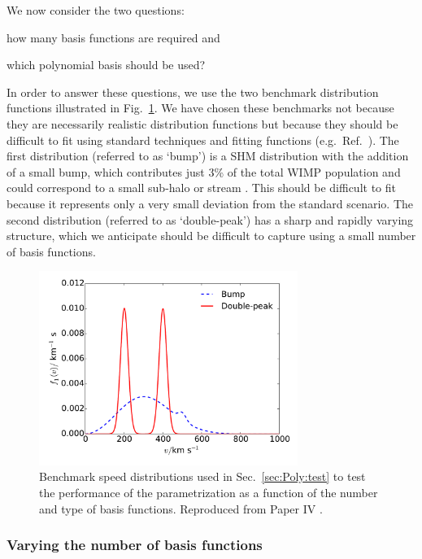 We now consider the two questions: \begin{inparaenum}[(i)] \item how many basis functions are required and \item which polynomial basis should be used? \end{inparaenum} In order to answer these questions, we use the two benchmark distribution functions illustrated in Fig.~\ref{fig:Poly:VaryingN_distributions}. We have chosen these benchmarks not because they are necessarily realistic distribution functions but because they should be difficult to fit using standard techniques and fitting functions (e.g.~Ref.~\cite{Lisanti:2010}). The first distribution (referred to as `bump') is a SHM distribution with the addition of a small bump, which contributes just 3\% of the total WIMP population and could correspond to a small sub-halo or stream \cite{Vogelsberger:2009}. This should be difficult to fit because it represents only a very small deviation from the standard scenario. The second distribution (referred to as `double-peak') has a sharp and rapidly varying structure, which we anticipate should be difficult to capture using a small number of basis functions.

\begin{figure}[t]
\centering
  \includegraphics[width=0.75\textwidth]{Poly/SpeedDistributions-VaryingN.pdf}
  \caption[Speed distributions used to test the number and type of polynomial basis functions]{Benchmark speed distributions used in Sec.~\ref{sec:Poly:test} to test the performance of the parametrization as a function of the number and type of basis functions. Reproduced from Paper IV \cite{Kavanagh:2014}.}
  \label{fig:Poly:VaryingN_distributions}
\end{figure}

\subsubsection{Varying the number of basis functions}

